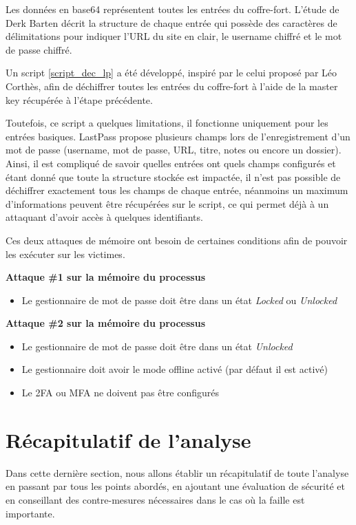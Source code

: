 Les données en base64 représentent toutes les entrées du coffre-fort. L'étude de Derk Barten décrit la structure de chaque entrée qui possède des caractères de délimitations pour indiquer l'URL du site en clair, le username chiffré et le mot de passe chiffré.

Un script \ref{script_dec_lp} a été développé, inspiré par le celui proposé par Léo Corthès, afin de déchiffrer toutes les entrées du coffre-fort à l'aide de la master key récupérée à l'étape précédente. 

Toutefois, ce script a quelques limitations, il fonctionne uniquement pour les entrées basiques. LastPass propose plusieurs champs lors de l'enregistrement d'un mot de passe (username, mot de passe, URL, titre, notes ou encore un dossier). Ainsi, il est compliqué de savoir quelles entrées ont quels champs configurés et étant donné que toute la structure stockée est impactée, il n'est pas possible de déchiffrer exactement tous les champs de chaque entrée, néanmoins un maximum d'informations peuvent être récupérées sur le script, ce qui permet déjà à un attaquant d'avoir accès à quelques identifiants. 

Ces deux attaques de mémoire ont besoin de certaines conditions afin de pouvoir les exécuter sur les victimes.

\textbf{Attaque \#1 sur la mémoire du processus} 

\begin{itemize}
	\item Le gestionnaire de mot de passe doit être dans un état \textit{Locked} ou \textit{Unlocked}
\end{itemize}

\textbf{Attaque \#2 sur la mémoire du processus} 
\begin{itemize}
	\item Le gestionnaire de mot de passe doit être dans un état \textit{Unlocked}
	\item Le gestionnaire doit avoir le mode offline activé (par défaut il est activé)
	\item Le 2FA ou MFA ne doivent pas être configurés
\end{itemize}



\section{Récapitulatif de l'analyse}

Dans cette dernière section, nous allons établir un récapitulatif de toute l'analyse en passant par tous les points abordés, en ajoutant une évaluation de sécurité et en conseillant des contre-mesures nécessaires dans le cas où la faille est importante. 


